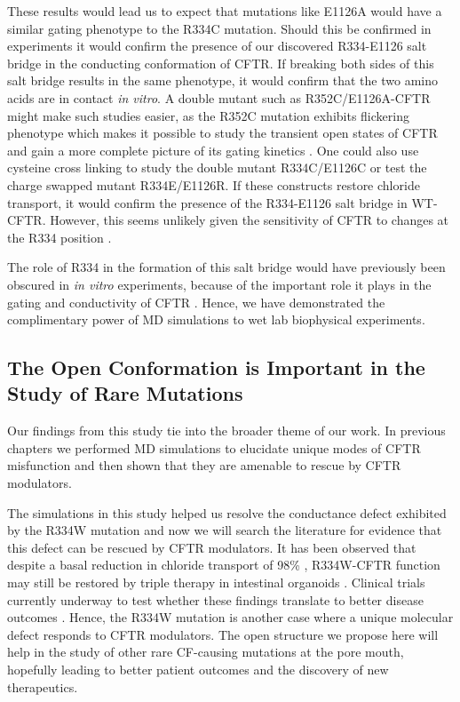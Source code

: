These results would lead us to expect that mutations like E1126A would have a similar gating phenotype to the R334C mutation. Should this be confirmed in experiments it would confirm the presence of our discovered R334-E1126 salt bridge in the conducting conformation of CFTR. If breaking both sides of this salt bridge results in the same phenotype, it would confirm that the two amino acids are in contact \textit{in vitro}. A double mutant such as R352C/E1126A-CFTR might make such studies easier, as the R352C mutation exhibits flickering phenotype which makes it possible to study the transient open states of CFTR and gain a more complete picture of its gating kinetics \cite{csanady2017, zhang2017b}. One could also use cysteine cross linking to study the double mutant R334C/E1126C or test the charge swapped mutant R334E/E1126R. If these constructs restore chloride transport, it would confirm the presence of the R334-E1126 salt bridge in WT-CFTR. However, this seems unlikely given the sensitivity of CFTR to changes at the R334 position \cite{gong2004}. 

The role of R334 in the formation of this salt bridge would have previously been obscured in \textit{in vitro} experiments, because of the important role it plays in the gating and conductivity of CFTR \cite{gong2003, gong2004}. Hence, we have demonstrated the complimentary power of MD simulations to wet lab biophysical experiments. %

\subsection{The Open Conformation is Important in the Study of Rare Mutations}

Our findings from this study tie into the broader theme of our work. In previous chapters we performed MD simulations to elucidate unique modes of CFTR misfunction and then shown that they are amenable to rescue by CFTR modulators. 

The simulations in this study helped us resolve the conductance defect exhibited by the R334W mutation and now we will search the literature for evidence that this defect can be rescued by CFTR modulators. It has been observed that despite a basal reduction in chloride transport of 98\% \cite{han2018}, R334W-CFTR function may still be restored by triple therapy in intestinal organoids \cite{vanwilligen2019}. Clinical trials currently underway to test whether these findings translate to better disease outcomes \cite{R334W_Euro_CF_trial}. Hence, the R334W mutation is another case where a unique molecular defect responds to CFTR modulators. The open structure we propose here will help in the study of other rare CF-causing mutations at the pore mouth, hopefully leading to better patient outcomes and the discovery of new therapeutics.


